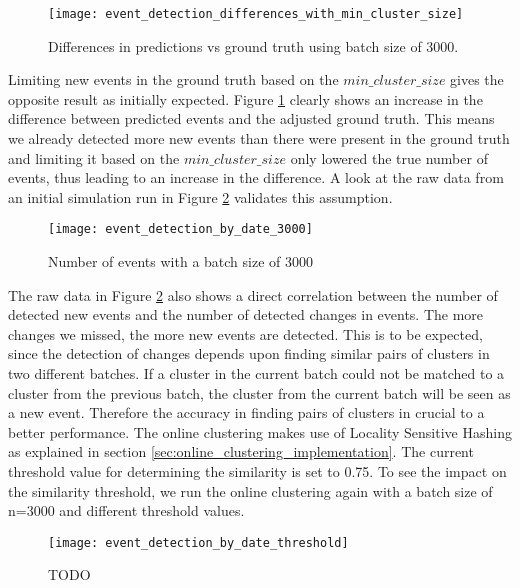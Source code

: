 \begin{figure}[h]
    \centering
    \texttt{[image: event\_detection\_differences\_with\_min\_cluster\_size]}
    \caption{Differences in predictions vs ground truth using batch size of 3000.}
    \label{fig:event_detection_differences_with_min_cluster_size}
\end{figure}

Limiting new events in the ground truth based on the $min\_cluster\_size$ gives the opposite result as initially expected. 
Figure \ref{fig:event_detection_differences_with_min_cluster_size} clearly shows an increase in the difference between predicted events and the adjusted ground truth. This means we already detected more new events than there were present in the ground truth and limiting it based on the $min\_cluster\_size$ only lowered the true number of events, thus leading to an increase in the difference. A look at the raw data from an initial simulation run in Figure \ref{fig:event_detection_by_date_3000} validates this assumption.

\begin{figure}[h]
    \centering
    \texttt{[image: event\_detection\_by\_date\_3000]}
    \caption{Number of events with a batch size of 3000}
    \label{fig:event_detection_by_date_3000}
\end{figure}

The raw data in Figure \ref{fig:event_detection_by_date_3000} also shows a direct correlation between the number of detected new events and the number of detected changes in events. The more changes we missed, the more new events are detected. This is to be expected, since the detection of changes depends upon finding similar pairs of clusters in two different batches. If a cluster in the current batch could not be matched to a cluster from the previous batch, the cluster from the current batch will be seen as a new event. Therefore the accuracy in finding pairs of clusters in crucial to a better performance. The online clustering makes use of Locality Sensitive Hashing as explained in section \ref{sec:online_clustering_implementation}. The current threshold value for determining the similarity is set to 0.75. To see the impact on the similarity threshold, we run the online clustering again with a batch size of n=3000 and different threshold values.

\begin{figure}[h]
    \centering
    \texttt{[image: event\_detection\_by\_date\_threshold]}
    \caption{TODO}
    \label{fig:event_detection_by_date_threshold}
\end{figure}

